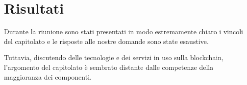 \section{Risultati}

Durante la riunione sono stati presentati in modo estremamente chiaro i vincoli del capitolato e le risposte alle nostre domande sono state esaustive.

Tuttavia, discutendo delle tecnologie e dei servizi in uso sulla blockchain, l'argomento del capitolato è sembrato distante dalle competenze della maggioranza dei componenti.
